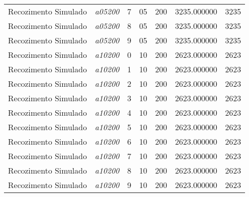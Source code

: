 {\begin{longtable}{cc|c|cc|cc}
			Recozimento Simulado & \textit{a05200}    & 7                               & 05               & 200              & 3235.000000                          & 3235 \\ 
			Recozimento Simulado & \textit{a05200}    & 8                               & 05               & 200              & 3235.000000                          & 3235 \\ 
			Recozimento Simulado & \textit{a05200}    & 9                               & 05               & 200              & 3235.000000                          & 3235 \\ \hline
			Recozimento Simulado & \textit{a10200}    & 0                               & 10               & 200              & 2623.000000                          & 2623 \\ 
			Recozimento Simulado & \textit{a10200}    & 1                               & 10               & 200              & 2623.000000                          & 2623 \\ 
			Recozimento Simulado & \textit{a10200}    & 2                               & 10               & 200              & 2623.000000                          & 2623 \\ 
			Recozimento Simulado & \textit{a10200}    & 3                               & 10               & 200              & 2623.000000                          & 2623 \\ 
			Recozimento Simulado & \textit{a10200}    & 4                               & 10               & 200              & 2623.000000                          & 2623 \\ 
			Recozimento Simulado & \textit{a10200}    & 5                               & 10               & 200              & 2623.000000                          & 2623 \\ 
			Recozimento Simulado & \textit{a10200}    & 6                               & 10               & 200              & 2623.000000                          & 2623 \\ 
			Recozimento Simulado & \textit{a10200}    & 7                               & 10               & 200              & 2623.000000                          & 2623 \\ 
			Recozimento Simulado & \textit{a10200}    & 8                               & 10               & 200              & 2623.000000                          & 2623 \\ 
			Recozimento Simulado & \textit{a10200}    & 9                               & 10               & 200              & 2623.000000                          & 2623 \\ \hline

\end{longtable}}
